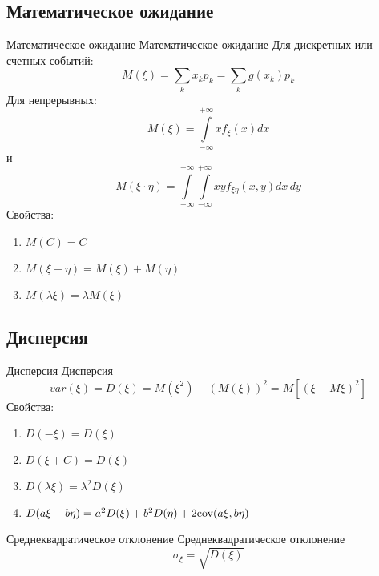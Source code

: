 \documentclass[12pt]{article}
\begin{document}
\subsection{Математическое ожидание}
\begin{definition}
    {Математическое ожидание}
    {Математическое ожидание}
    Для дискретных или счетных событий:
    \begin{displaymath}
        M(\xi)=\sum\limits_{k}x_{k}p_{k}
        =\sum\limits_{k}g(x_{k})p_{k}
    \end{displaymath}
    Для непрерывных:
    \begin{displaymath}
        M(\xi)=\int\limits_{-\infty}^{+\infty}xf_{\xi}(x)dx
    \end{displaymath}
    и
    \begin{displaymath}
        M(\xi\cdot\eta)=\int\limits_{-\infty}^{+\infty}\int\limits_{-\infty}^{+\infty}
        xyf_{\xi\eta}(x,y)dx\,dy
    \end{displaymath}
    Свойства:
    \begin{enumerate}
        \item $M(C)=C$
        \item $M(\xi+\eta)=M(\xi)+M(\eta)$
        \item $M(\lambda\xi)=\lambda M(\xi)$
    \end{enumerate}
\end{definition}

\subsection{Дисперсия}
\begin{definition}
    {Дисперсия}
    {Дисперсия}
    \begin{displaymath}
        var(\xi)=D(\xi)=M(\xi^{2})-(M(\xi))^{2}=M\left[(\xi-M\xi)^{2}\right]
    \end{displaymath}
    Свойства:
    \begin{enumerate}
        \item $D(-\xi)=D(\xi)$
        \item $D(\xi+C)=D(\xi)$
        \item $D(\lambda\xi)=\lambda^{2}D(\xi)$
        \item $D(a\xi+b\eta)=a^{2}D(\xi)+b^{2}D(\eta)+2\textmd{cov}(a\xi,b\eta)$
    \end{enumerate}
\end{definition}

\begin{definition}
    {Среднеквадратическое отклонение}
    {Среднеквадратическое отклонение}
    \begin{displaymath}
        \sigma_{\xi}=\sqrt{D(\xi)}
    \end{displaymath}
\end{definition}
\end{document}
